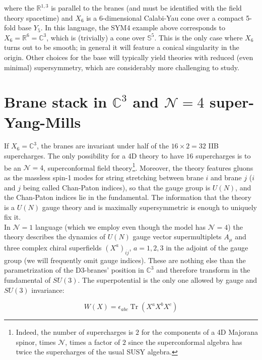 \documentclass[11pt,a4paper,oneside,openright,titlepage]{book}
\DeclareMathOperator{\Tr}{Tr}
\begin{document}
where the $\mathbb{R}^{1,3}$ is parallel to the branes (and must be identified with the field theory spacetime) and $X_6$ is a 6-dimensional Calabi-Yau cone over a compact 5-fold base $Y_5$. In this language, the SYM4 example above corresponds to $X_6 = \mathbb{R}^6 = \mathbb{C}^3$, which is (trivially) a cone over $\mathbb{S}^5$. This is the only case where $X_6$ turns out to be smooth; in general it will feature a conical singularity in the origin. Other choices for the base will typically yield theories with reduced (even minimal) supersymmetry, which are considerably more challenging to study.

\section{Brane stack in $\mathbb{C}^3$ and $\mathcal{N}=4$ super-Yang-Mills}

If $X_6 = \mathbb{C}^3$, the branes are invariant under half of the $16 \times 2 = 32$ IIB supercharges. The only possibility for a 4D theory to have $16$ supercharges is to be an $\mathcal{N}=4$, superconformal field theory\footnote{Indeed, the number of supercharges is $2$ for the components of a 4D Majorana spinor, times $\mathcal{N}$, times a factor of $2$ since the superconformal algebra has twice the supercharges of the usual SUSY algebra.}. Moreover, the theory features gluons as the massless spin-1 modes for string stretching between brane $i$ and brane $j$ ($i$ and $j$ being called Chan-Paton indices), so that the gauge group is $U(N)$, and the Chan-Paton indices lie in the fundamental. The information that the theory is a $U(N)$ gauge theory and is maximally supersymmetric is enough to uniquely fix it.\\

In $\mathcal{N}=1$ language (which we employ even though the model has $\mathcal{N}=4$) the theory describes the dynamics of $U(N)$ gauge vector supermultiplets $A_\mu$ and three complex chiral superfields $(X^a)_{i\dot j}$, $a=1,2,3$ in the adjoint of the gauge group (we will frequently omit gauge indices). These are nothing else than the parametrization of the D3-branes' position in $\mathbb{C}^3$ and therefore transform in the fundamental of $SU(3)$. The superpotential is the only one allowed by gauge and $SU(3)$ invariance:

\begin{equation} W(X) = \epsilon_{abc} \Tr ( X^a X^b X^c) \end{equation}
\end{document}
